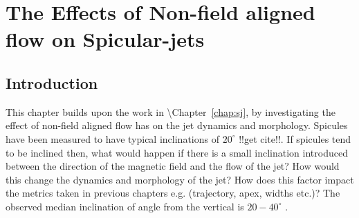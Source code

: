 \documentclass[12pt]{ociamthesis}
\newcommand{\degs}{^{\circ}}
\begin{document}
\baselineskip=18pt

\setcounter{secnumdepth}{3}
\setcounter{tocdepth}{3}

\setcounter{chapter}{2}

\chapter{The Effects of Non-field aligned flow on Spicular-jets}
\section{Introduction}
\label{sec:c3intro}
This chapter builds upon the work in \cite{?}\textbackslash Chapter~\ref{chap:sj}, by investigating the effect of non-field aligned flow has on the jet dynamics and morphology. Spicules have been measured to have typical inclinations of $20^{\circ}$ !!get cite!!. If spicules tend to be inclined then, what would happen if there is a small inclination introduced between the direction of the magnetic field and the flow of the jet? How would this change the dynamics and morphology of the jet? How does this factor impact the metrics taken in previous chapters e.g. (trajectory, apex, widths etc.)? The observed median inclination of angle from the vertical is $20-40\degs$ \citep{Beckers1968,Tsiropoula2012}.  
\end{document}
